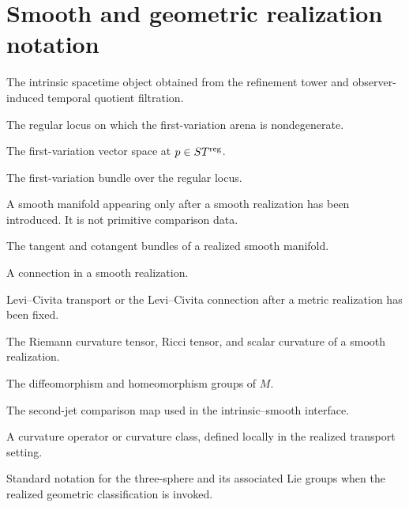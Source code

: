 \section*{Smooth and geometric realization notation}
\begin{description}[leftmargin=3.6cm,style=nextline]
\item[\(ST\)]
The intrinsic spacetime object obtained from the refinement tower and
observer-induced temporal quotient filtration.
\item[\(ST^{\reg}\)]
The regular locus on which the first-variation arena is nondegenerate.
\item[\(V_p\)]
The first-variation vector space at \(p\in ST^{\mathrm{reg}}\).
\item[\(T^{(1)}ST^{\reg}\)]
The first-variation bundle over the regular locus.
\item[\(M\)]
A smooth manifold appearing only after a smooth realization has been
introduced.  It is not primitive comparison data.
\item[\(TM\), \(T^*M\)]
The tangent and cotangent bundles of a realized smooth manifold.
\item[\(\nabla\)]
A connection in a smooth realization.
\item[\(\LC\)]
Levi--Civita transport or the Levi--Civita connection after a metric
realization has been fixed.
\item[\(\Riem\), \(\Ric\), \(\Scal\)]
The Riemann curvature tensor, Ricci tensor, and scalar curvature of a
smooth realization.
\item[\(\Diff(M)\), \(\Homeo(M)\)]
The diffeomorphism and homeomorphism groups of \(M\).
\item[\(\Jtwo\)]
The second-jet comparison map used in the intrinsic--smooth interface.
\item[\(\Curv\)]
A curvature operator or curvature class, defined locally in the
realized transport setting.
\item[\(S^3\), \(SU(2)\), \(SO(3)\)]
Standard notation for the three-sphere and its associated Lie groups
when the realized geometric classification is invoked.
\end{description}

